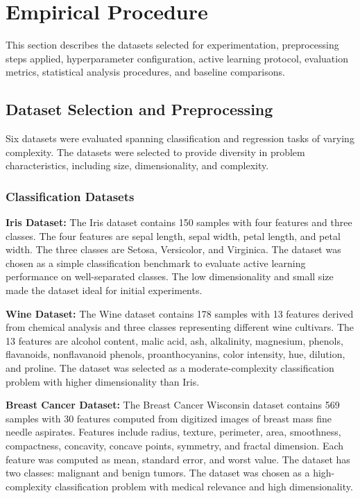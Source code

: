 \documentclass[conference]{IEEEtran}
\begin{document}
\section{Empirical Procedure}

This section describes the datasets selected for experimentation, preprocessing steps applied, hyperparameter configuration, active learning protocol, evaluation metrics, statistical analysis procedures, and baseline comparisons.

\subsection{Dataset Selection and Preprocessing}

Six datasets were evaluated spanning classification and regression tasks of varying complexity. The datasets were selected to provide diversity in problem characteristics, including size, dimensionality, and complexity.

\subsubsection{Classification Datasets}

\textbf{Iris Dataset:}
The Iris dataset contains 150 samples with four features and three classes. The four features are sepal length, sepal width, petal length, and petal width. The three classes are Setosa, Versicolor, and Virginica. The dataset was chosen as a simple classification benchmark to evaluate active learning performance on well-separated classes. The low dimensionality and small size made the dataset ideal for initial experiments.

\textbf{Wine Dataset:}
The Wine dataset contains 178 samples with 13 features derived from chemical analysis and three classes representing different wine cultivars. The 13 features are alcohol content, malic acid, ash, alkalinity, magnesium, phenols, flavanoids, nonflavanoid phenols, proanthocyanins, color intensity, hue, dilution, and proline. The dataset was selected as a moderate-complexity classification problem with higher dimensionality than Iris.

\textbf{Breast Cancer Dataset:}
The Breast Cancer Wisconsin dataset contains 569 samples with 30 features computed from digitized images of breast mass fine needle aspirates. Features include radius, texture, perimeter, area, smoothness, compactness, concavity, concave points, symmetry, and fractal dimension. Each feature was computed as mean, standard error, and worst value. The dataset has two classes: malignant and benign tumors. The dataset was chosen as a high-complexity classification problem with medical relevance and high dimensionality.
\end{document}
